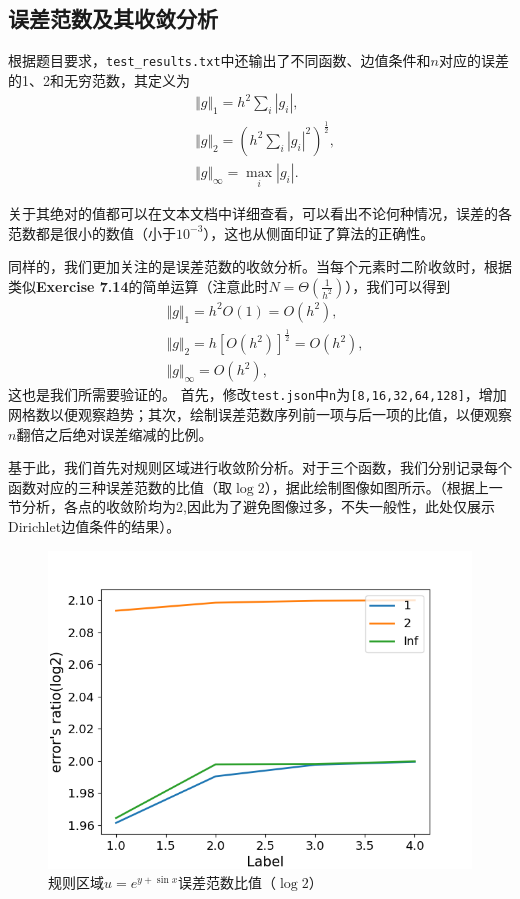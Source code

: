 \documentclass{ctexart}
\begin{document}
\begin{sloppypar}
\subsection{误差范数及其收敛分析}
根据题目要求，\verb|test_results.txt|中还输出了不同函数、边值条件和$n$对应的误差的1、2和无穷范数，其定义为
\begin{equation}
\begin{aligned}
    &\Vert g \Vert_1 = h^2 \sum_i|g_i|, \\
    &\Vert g \Vert_2 = \left(h^2 \sum_i|g_i|^2\right)^{\frac{1}{2}}, \\
    &\Vert g \Vert_{\infty} = \max_i|g_i|.
\end{aligned}
\end{equation}

关于其绝对的值都可以在文本文档中详细查看，可以看出不论何种情况，误差的各范数都是很小的数值（小于$10^{-3}$），这也从侧面印证了算法的正确性。

同样的，我们更加关注的是误差范数的收敛分析。当每个元素时二阶收敛时，根据类似\textbf{Exercise 7.14}的简单运算（注意此时$N=\Theta(\frac{1}{h^2})$），我们可以得到
\begin{equation}
\begin{aligned}
    &\Vert g \Vert_1 = h^2O(1) = O(h^2), \\
    &\Vert g \Vert_2 = h[O(h^2)]^{\frac{1}{2}} = O(h^2), \\
    &\Vert g \Vert_{\infty} = O(h^2),
\end{aligned}
\end{equation}
这也是我们所需要验证的。
首先，修改\verb|test.json|中\verb|n|为\verb|[8,16,32,64,128]|，增加网格数以便观察趋势；其次，绘制误差范数序列前一项与后一项的比值，以便观察$n$翻倍之后绝对误差缩减的比例。

基于此，我们首先对规则区域进行收敛阶分析。对于三个函数，我们分别记录每个函数对应的三种误差范数的比值（取$\log 2$），据此绘制图像如图所示。（根据上一节分析，各点的收敛阶均为2,因此为了避免图像过多，不失一般性，此处仅展示Dirichlet边值条件的结果）。
\begin{figure}[H]
\centering
\includegraphics[scale = 0.5]{f1_NE.png}
\caption{规则区域$u=e^{y+\sin x}$误差范数比值（$\log 2$）}
\label{fig7}
\end{figure}


\end{sloppypar}
\end{document}
